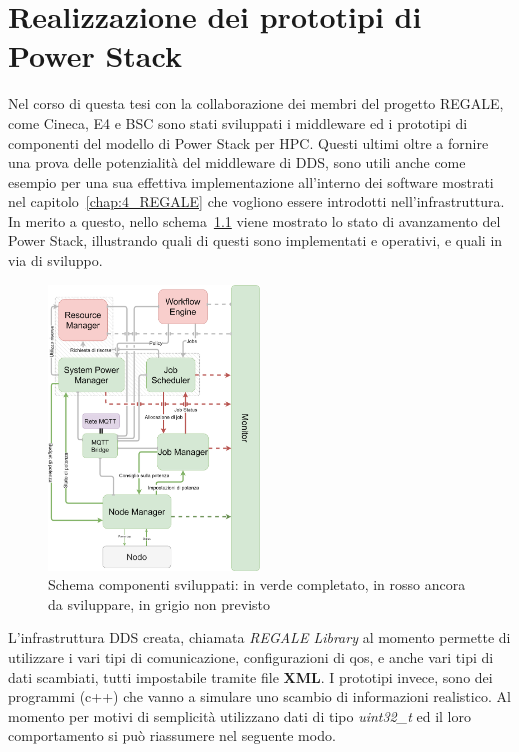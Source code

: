 \chapter{Realizzazione dei prototipi di Power Stack}
Nel corso di questa tesi con la collaborazione dei membri del progetto REGALE, come Cineca\cite{Cineca}, E4\cite{E4} e BSC\cite{BSC} sono stati sviluppati i middleware ed i prototipi di componenti del modello di Power Stack per HPC.
Questi ultimi oltre a fornire una prova delle potenzialità del middleware di DDS, sono utili anche come esempio per una sua effettiva implementazione all'interno dei software mostrati nel capitolo~\ref{chap:4_REGALE} che vogliono essere introdotti nell'infrastruttura.
In merito a questo, nello schema~\ref{fig:schema_global_dummy_implementati} viene mostrato lo stato di avanzamento del Power Stack, illustrando quali di questi sono implementati e operativi, e quali in via di sviluppo.

\begin{figure}[H]
    \centering
    \includegraphics[width=0.5\textwidth]{./img/SchemaPowerStack_perdummy.drawio.png}
    \caption{Schema componenti sviluppati: in verde completato, in rosso ancora da sviluppare, in grigio non previsto}
    \label{fig:schema_global_dummy_implementati}
\end{figure}
L'infrastruttura DDS creata, chiamata \emph{REGALE Library}\cite{RegaleLibrary} al momento permette di utilizzare i vari tipi di comunicazione, configurazioni di qos, e anche vari tipi di dati scambiati, tutti impostabile tramite file \textbf{XML}.
I prototipi invece, sono dei programmi (c++) che vanno a simulare uno scambio di informazioni realistico. Al momento per motivi di semplicità utilizzano dati di tipo \emph{uint32\_t} ed il loro comportamento si può riassumere nel seguente modo.

